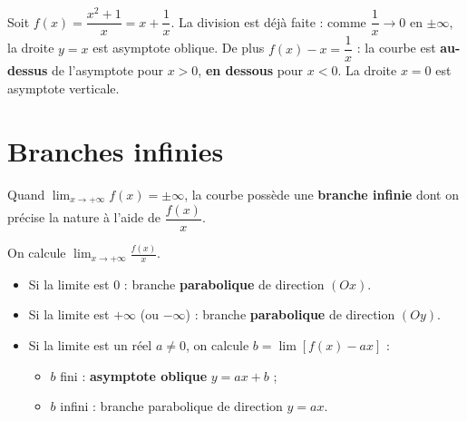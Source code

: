 \begin{exemple}
Soit $f(x)=\dfrac{x^2+1}{x}=x+\dfrac{1}{x}$. La division est déjà faite : comme
$\dfrac{1}{x}\to 0$ en $\pm\infty$, la droite $y=x$ est asymptote oblique. De plus
$f(x)-x=\dfrac{1}{x}$ : la courbe est \textbf{au-dessus} de l'asymptote pour $x>0$,
\textbf{en dessous} pour $x<0$. La droite $x=0$ est asymptote verticale.
\end{exemple}

\begin{illus}
\end{illus}

\section{Branches infinies}

Quand $\displaystyle\lim_{x\to+\infty}f(x)=\pm\infty$, la courbe possède une
\textbf{branche infinie} dont on précise la nature à l'aide de $\dfrac{f(x)}{x}$.

\begin{aretenir}
On calcule $\displaystyle\lim_{x\to+\infty}\frac{f(x)}{x}$.
\begin{itemize}
  \item Si la limite est $0$ : branche \textbf{parabolique} de direction $(Ox)$.
  \item Si la limite est $+\infty$ (ou $-\infty$) : branche \textbf{parabolique} de
        direction $(Oy)$.
  \item Si la limite est un réel $a\neq 0$, on calcule $b=\lim[f(x)-ax]$ :
        \begin{itemize}
          \item $b$ fini : \textbf{asymptote oblique} $y=ax+b$ ;
          \item $b$ infini : branche parabolique de direction $y=ax$.
        \end{itemize}
\end{itemize}
\end{aretenir}

